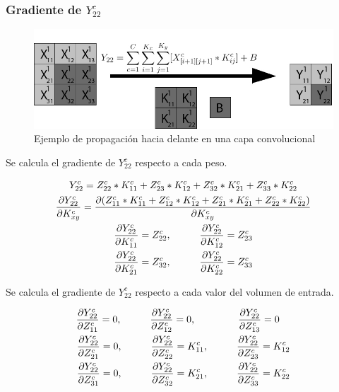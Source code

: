 \subsubsection{Gradiente de $Y^c_{22}$}

\begin{figure}[H]
	\centering
	\includegraphics[width=1\linewidth]{imagenes/conv_ejemplo_backprop_4.jpg} 
	\caption{Ejemplo de propagación hacia delante en una capa convolucional}
	\label{fig:ejemplo_4_forward_prop_convolucional}
\end{figure}

Se calcula el gradiente de $Y^c_{22}$ respecto a cada peso.

\begin{gather}
	Y^c_{22} = Z^c_{22} * K^c_{11} + Z^c_{23} * K^c_{12} + Z^c_{32} * K^c_{21} + Z^c_{33} * K^c_{22} \\
	\frac{\partial Y^c_{22}}{\partial K^c_{xy}} = \frac{\partial (Z^c_{11} * K^c_{11} + Z^c_{12} * K^c_{12} + Z^c_{21} * K^c_{21} + Z^c_{22} * K^c_{22})}{\partial K^c_{xy}} \\
	\frac{\partial Y^c_{22}}{\partial K^c_{11}} = Z^c_{22}, \hspace{10mm} \frac{\partial Y^c_{22}}{\partial K^c_{12}} = Z^c_{23}\\
	\frac{\partial Y^c_{22}}{\partial K^c_{21}} = Z^c_{32}, \hspace{10mm} \frac{\partial Y^c_{22}}{\partial K^c_{22}} = Z^c_{33}
\end{gather}

Se calcula el gradiente de $Y^c_{22}$ respecto a cada valor del volumen de entrada.

\begin{gather}
	\frac{\partial Y^c_{22}}{\partial Z^c_{11}} = 0, \hspace{10mm} \frac{\partial Y^c_{22}}{\partial Z^c_{12}} = 0, \hspace{15mm} \frac{\partial Y^c_{22}}{\partial Z^c_{13}} = 0 \hspace{4mm} \\
	\frac{\partial Y^c_{22}}{\partial Z^c_{21}} = 0, \hspace{10mm} \frac{\partial Y^c_{22}}{\partial Z^c_{22}} = K^c_{11}, \hspace{10mm} \frac{\partial Y^c_{22}}{\partial Z^c_{23}} = K^c_{12}\\
	\frac{\partial Y^c_{22}}{\partial Z^c_{31}} = 0, \hspace{10mm} \frac{\partial Y^c_{22}}{\partial Z^c_{32}} = K^c_{21}, \hspace{10mm} \frac{\partial Y^c_{22}}{\partial Z^c_{33}} = K^c_{22}
\end{gather}

